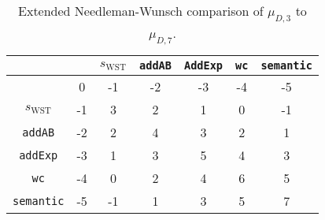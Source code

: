 \begin{table}[h!]
\begin{center}
\begin{tabular}{c | c c c c c c }
 & & $s_\text{WST}$ & \texttt{addAB} & \texttt{AddExp} & \texttt{wc} & \texttt{semantic}\\
\hline
 & 0 & -1 & -2 & -3 & -4 & -5\\
$s_\text{WST}$ & -1 & 3 & 2 & 1 & 0 & -1\\
\texttt{addAB} & -2 & 2 & 4 & 3 & 2 & 1\\
\texttt{addExp} & -3 & 1 & 3 & 5 & 4 & 3\\
\texttt{wc} & -4 & 0 & 2 & 4 & 6 & 5\\
\texttt{semantic} & -5 & -1 & 1 & 3 & 5 & 7
\end{tabular}
\caption{Extended Needleman-Wunsch comparison of $\mu_{D,3}$ to $\mu_{D,7}$.}
\label{tbl:extal2}
\end{center}
\end{table}
